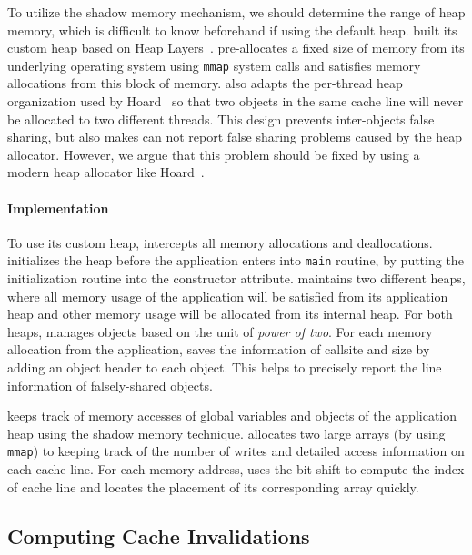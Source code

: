 To utilize the shadow memory mechanism, we should determine the range of heap memory, which is difficult to know beforehand if using the default heap. \cheetah{} built its custom heap based on Heap Layers~\cite{Berger:2001:CHM:378795.378821}. \cheetah{} pre-allocates a fixed size of memory
from its underlying operating system using \texttt{mmap} system calls and satisfies memory allocations from this block of memory. \cheetah{} also adapts the per-thread heap organization used by Hoard~\cite{Hoard} so that two objects in the same cache line will never be allocated to two different threads. This design prevents inter-objects false sharing, but also makes \cheetah{} can not report false sharing problems caused by the heap allocator.  However, we argue that this problem should be fixed by using a modern heap allocator like Hoard~\cite{Hoard}. 

\paragraph{Implementation} 
To use its custom heap, \cheetah{} intercepts all memory allocations and deallocations. \cheetah{} initializes the heap before the application enters into \texttt{main} routine, by putting the initialization routine into the constructor attribute. \cheetah{} maintains two different heaps, where all memory usage of the application will be satisfied from its application heap and other memory usage will be allocated from its  internal heap. For both heaps, \cheetah{} manages objects based on the unit of {\it power of two}. For each memory allocation from the application, \cheetah{} saves the information of callsite and size by adding an object header to each object. This helps \cheetah{} to precisely report the line information of falsely-shared objects.  

\cheetah{} keeps track of memory accesses of global variables and objects of the application heap using the shadow memory technique. \Cheetah{} allocates two large arrays (by using \texttt{mmap}) to keeping track of the number of writes and detailed access information on each cache line. For each memory address, \cheetah{} uses the bit shift to compute the index of cache line and locates the placement of its corresponding array quickly. 


\subsection{Computing Cache Invalidations}
\label{sec:computeinvalidations}

